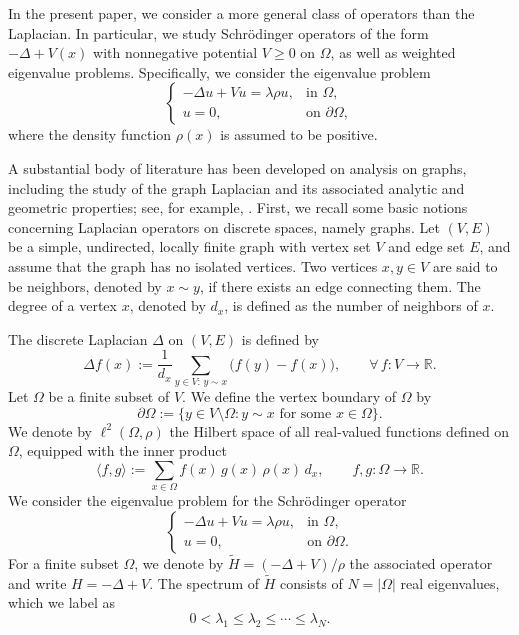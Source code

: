 \documentclass[11pt]{article}
\theoremstyle{definition}
\theoremstyle{remark}
\numberwithin{equation}{section}
\begin{document}
In the present paper, we consider a more general class of operators than the
Laplacian. In particular, we study Schrödinger operators of the form
$-\Delta + V(x)$ with nonnegative potential $V \ge 0$ on $\Omega$, as well as
weighted eigenvalue problems. Specifically, we consider the eigenvalue problem
\[
\begin{cases}
-\Delta u + V u = \lambda \rho u, & \text{in } \Omega, \\
u = 0, & \text{on } \partial \Omega,
\end{cases}
\]
where the density function $\rho(x)$ is assumed to be positive.

A substantial body of literature has been developed on analysis on graphs,
 including the study of the graph Laplacian and its associated analytic and geometric properties;
  see, for example, \cite{grigor2018introduction,dodziuk1984difference,chung2000harnack,chung2000weighted}.
First, we recall some basic notions concerning Laplacian operators on discrete
spaces, namely graphs. Let $(V,E)$ be a simple, undirected, locally finite graph
with vertex set $V$ and edge set $E$, and assume that the graph has no isolated
vertices. Two vertices $x,y \in V$ are said to be neighbors, denoted by $x \sim y$,
if there exists an edge connecting them. The degree of a vertex $x$, denoted by
$d_x$, is defined as the number of neighbors of $x$.

The discrete Laplacian $\Delta$ on $(V,E)$ is defined by
\[
\Delta f(x) := \frac{1}{d_x} \sum_{y \in V:\, y \sim x} \bigl( f(y) - f(x) \bigr),
\qquad \forall\, f : V \to \mathbb{R}.
\]
\noindent
Let $\Omega$ be a finite subset of $V$. We define the vertex boundary of $\Omega$ by
\[
\partial \Omega := \{ y \in V \setminus \Omega : y \sim x \text{ for some } x \in \Omega \}.
\]
\noindent
We denote by $\ell^{2}(\Omega,\rho)$ the Hilbert space of all real-valued functions
defined on $\Omega$, equipped with the inner product
\[
\langle f, g \rangle := \sum_{x \in \Omega} f(x)\, g(x)\, \rho(x)\, d_x,
\qquad f,g : \Omega \to \mathbb{R}.
\]
\noindent
We consider the eigenvalue problem for the Schrödinger operator
\[
\begin{cases}
-\Delta u + V u = \lambda \rho u, & \text{in } \Omega, \\
u = 0, & \text{on } \partial \Omega.
\end{cases}
\]
\noindent
For a finite subset $\Omega$, we denote by $\widetilde{H} = (-\Delta + V)/\rho$
the associated operator and write $H = -\Delta + V$. The spectrum of
$\widetilde{H}$ consists of $N = |\Omega|$ real eigenvalues, which we label as
\[
0 < \lambda_1 \le \lambda_2 \le \cdots \le \lambda_N.
\]
\end{document}
